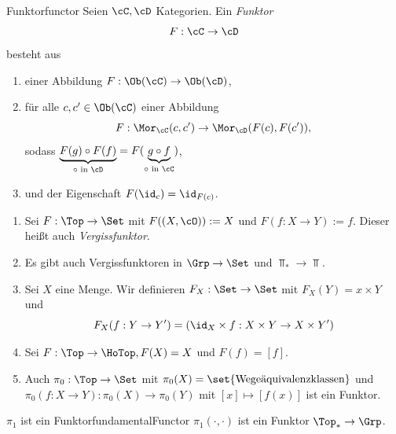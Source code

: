 \documentclass[language=ngerman]{TemplateLecture} %
\begin{document}
\begin{defi}{Funktor}{functor}
    Seien $\cC, \cD$ Kategorien. Ein \emph{Funktor}
    \begin{equation*}
        F: \cC \to \cD
    \end{equation*}
    besteht aus
    \begin{enumerate}[$(i)$]
        \item einer Abbildung $F: \Ob(\cC) \to \Ob(\cD)$,
        \item für alle $c, c' \in \Ob(\cC)$ einer Abbildung
        \begin{equation*}
            F: \Mor_\cC(c, c') \to \Mor_\cD(F(c), F(c')),
        \end{equation*}
        sodass $\underset{\text{$\circ$ in $\cD$}}{\underbrace{F(g) \circ F(f)}} = F(\underset{\text{$\circ$ in $\cC$}}{\underbrace{g \circ f}})$,
        \item und der Eigenschaft $F(\id_c) = \id_{F(c)}$.
    \end{enumerate}
\end{defi}
\begin{example}
    \begin{enumerate}[$(i)$]
        \item Sei $F: \Top \to \Set$ mit $F((X, \cO)) := X$ und $F(f: X \to Y) := f$. Dieser heißt auch \emph{Vergissfunktor}.
        \item Es gibt auch Vergissfunktoren in $\Grp \to \Set$ und $\Top_* \to \Top$.
        \item Sei $X$ eine Menge. Wir definieren $F_X: \Set \to \Set$ mit $F_X(Y) = x \times Y$ und
        \begin{equation*}
            F_X(f: Y \to Y') = (\id_X \times f: X \times Y \to X \times Y')
        \end{equation*}
        \item Sei $F: \Top \to \HoTop, F(X) = X$ und $F(f) = [f]$.
        \item Auch $\pi_0: \Top \to \Set$ mit $\pi_0(X) = \set{\text{Wegeäquivalenzklassen}}$ und $\pi_0(f: X \to Y): \pi_0(X) \to \pi_0(Y)$ mit $[x] \mapsto [f(x)]$ ist ein Funktor.
    \end{enumerate}
\end{example}

\begin{thm}{$\pi_1$ ist ein Funktor}{fundamentalFunctor}
    $\pi_1(\cdot, \cdot)$ ist ein Funktor $\Top_* \to \Grp$.
\end{thm}
\end{document}
